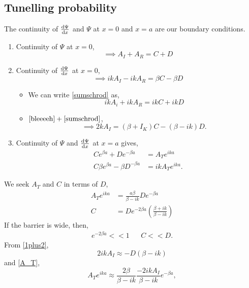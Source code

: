 \documentclass{book}
\begin{document}
\subsection{Tunelling probability}
The continuity of $\dv{\Psi}{x}$ and $\Psi$ at $x=0$ and $x=a$ are our boundary conditions.
\begin{enumerate}
	\item Continuity of $\Psi$ at $x = 0$,
	\begin{equation}
		\implies A_I + A_R = C + D \label{sumschrod}
	\end{equation}
	\item Continuity of $\dv{\Psi}{x}$ at $x = 0$,
	\begin{equation}
		\implies ikA_I - ikA_R = \beta C - \beta D \label{sumschroddiv}
	\end{equation}
	\begin{itemize}
		\item We can write \eqref{sumschrod} as,
		\begin{equation}
			ikA_i + ik A_R = ikC + ik D \label{bleeeeh}
		\end{equation}
		\item $\eqref{bleeeeh} + \eqref{sumschrod}$,
		\begin{equation}
			\implies 2kA_I = (\beta + I_K)C - (\beta -ik)D \label{1plus2}.
		\end{equation}
	\end{itemize}
	\item Continuity of $\Psi$ and $\dv{\Psi}{x}$ at $x = a$ gives,
	\begin{align}
		Ce^{\beta a} + De^{-\beta a} &= A_T e^{ika} \\
		C\beta e^{\beta a} - \beta D^{-\beta a} &= ikA_Te^{ika}.
	\end{align}
\end{enumerate}
We seek $A_T$ and $C$ in terms of $D$, 
\begin{align}
	A_Te^{ika} & = \frac{a\beta}{\beta - ik}De^{-\beta a} \label{A_T}\\
	C & = De^{-2\beta a}\left(\frac{\beta + ik}{\beta - ik}\right) \label{C}
\end{align}
If the barrier is wide, then,
\begin{align}
	e^{-2\beta a} << 1 && C << D.
\end{align}
From \eqref{1plus2},
\begin{equation}
	2ikA_I \approx -D\left(\beta - ik\right)
\end{equation}
and \eqref{A_T},
\begin{equation}
	A_Te^{ika} \approx \frac{2\beta }{\beta - ik}\frac{-2ikA_I}{\beta - ik}e^{-\beta a},
\end{equation}
\end{document}
